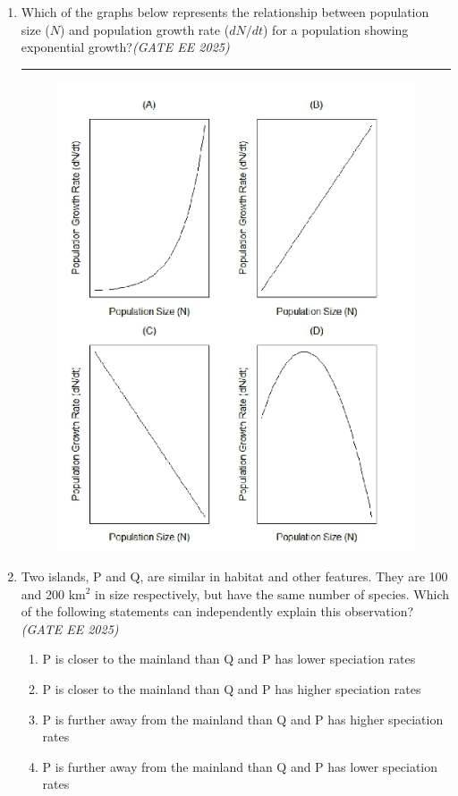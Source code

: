 \begin{enumerate}[leftmargin=*,label=\textbf{Q.\arabic*},resume]

\item Which of the graphs below represents the relationship between population size ($N$) and population growth rate ($dN/dt$) for a population showing exponential growth?\hfill \textit{(GATE EE 2025)}

\rule{8cm}{0.15mm} %
\vspace{1em}
\begin{figure}[h!]
    \centering
    \includegraphics[width=0.9\linewidth]{figs/imageQ41.png}
\end{figure}
\vspace{1em}
\item Two islands, P and Q, are similar in habitat and other features. They are 100 and 200 km$^2$ in size respectively, but have the same number of species. Which of the following statements can independently explain this observation? \hfill \textit{(GATE EE 2025)}
\begin{multicols}{2}
\begin{enumerate}[label=(\Alph*)]
\item P is closer to the mainland than Q and P has lower speciation rates
\item P is closer to the mainland than Q and P has higher speciation rates
\item P is further away from the mainland than Q and P has higher speciation rates
\item P is further away from the mainland than Q and P has lower speciation rates
\end{enumerate}
\end{multicols}


\end{enumerate}
